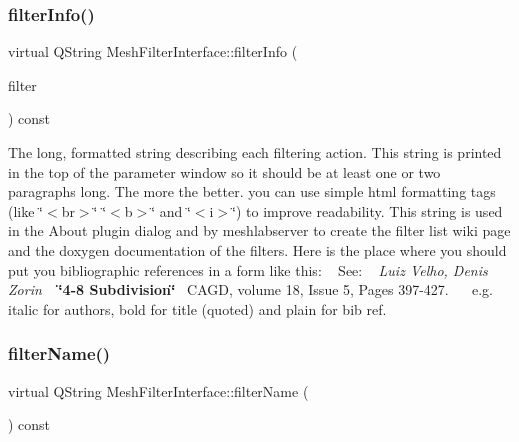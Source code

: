 \subsubsection{\texorpdfstring{filter\+Info()}{filterInfo()}}
{\footnotesize\ttfamily virtual Q\+String Mesh\+Filter\+Interface\+::filter\+Info (\begin{DoxyParamCaption}\item[{Filter\+I\+D\+Type}]{filter }\end{DoxyParamCaption}) const\hspace{0.3cm}{\ttfamily [pure virtual]}}

The long, formatted string describing each filtering action. This string is printed in the top of the parameter window so it should be at least one or two paragraphs long. The more the better. you can use simple html formatting tags (like \char`\"{}$<$br$>$\char`\"{} \char`\"{}$<$b$>$\char`\"{} and \char`\"{}$<$i$>$\char`\"{}) to improve readability. This string is used in the \textquotesingle{}About plugin\textquotesingle{} dialog and by meshlabserver to create the filter list wiki page and the doxygen documentation of the filters. Here is the place where you should put you bibliographic references in a form like this\+: ~\newline
 See\+: ~\newline
 {\itshape Luiz Velho, Denis Zorin }~\newline
 {\bfseries \char`\"{}4-\/8 Subdivision\char`\"{}}~\newline
 C\+A\+GD, volume 18, Issue 5, Pages 397-\/427.~\newline
 ~\newline
 e.\+g. italic for authors, bold for title (quoted) and plain for bib ref. \mbox{\label{class_mesh_filter_interface_ad57edd291a220d0b2384627c2f0657b9}} 
\subsubsection{\texorpdfstring{filter\+Name()}{filterName()}}
{\footnotesize\ttfamily virtual Q\+String Mesh\+Filter\+Interface\+::filter\+Name (\begin{DoxyParamCaption}\item[{Filter\+I\+D\+Type}]{ }\end{DoxyParamCaption}) const\hspace{0.3cm}{\ttfamily [pure virtual]}}

